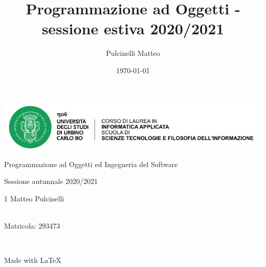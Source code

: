 \documentclass[12pt, a4paper]{article}
\title{Programmazione ad Oggetti - sessione estiva 2020/2021}
\date{\today}
\author{Pulcinelli Matteo}
\begin{document}
\begin{titlepage}
    \centering
    \includegraphics[width=\textwidth]{../logo.png}
    \par\vspace{1cm}
    \vspace{2cm}

    {\huge Programmazione ad Oggetti ed Ingegneria del Software\par}
    \vspace{0.5cm}

    {\Large Sessione autunnale 2020/2021\par}
    \vspace{5cm}

    \begin{tabular}{1}
        \large Matteo Pulcinelli \par \\
        \large Matricola: 293473 \par \\
    \end{tabular}


    \vfill
    \vspace{0.3cm}
    Made with \LaTeX
\end{titlepage}

\newpage\null\thispagestyle{empty}\newpage
{}
\tableofcontents
\newpage


\newpage



\newpage



\newpage



\newpage


\newpage

\newpage

\newpage


\end{document}
